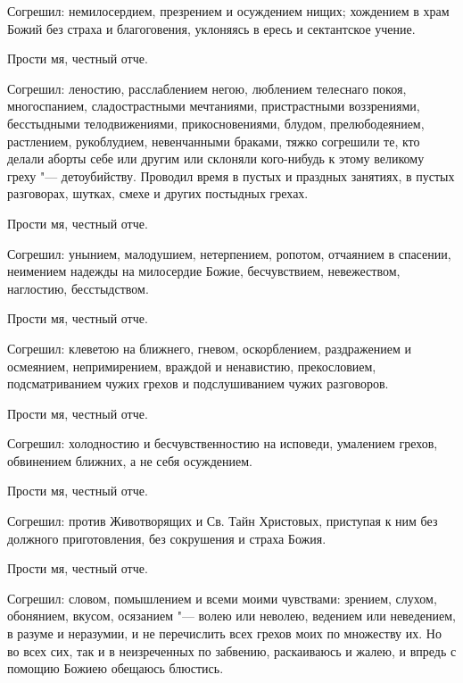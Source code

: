 Согрешил: немилосердием, презрением и осуждением нищих; хождением в храм Божий без страха и благоговения, уклоняясь в ересь и сектантское учение. 



Прости мя, честный отче. 



Согрешил: леностию, расслаблением негою, люблением телеснаго покоя, многоспанием, сладострастными мечтаниями, пристрастными воззрениями, бесстыдными телодвижениями, прикосновениями, блудом, прелюбодеянием, растлением, рукоблудием, невенчанными браками, тяжко согрешили те, кто делали аборты себе или другим или склоняли кого-нибудь к этому великому греху "--- детоубийству. Проводил время в пустых и праздных занятиях, в пустых разговорах, шутках, смехе и других постыдных грехах. 



Прости мя, честный отче. 



Согрешил: унынием, малодушием, нетерпением, ропотом, отчаянием в спасении, неимением надежды на милосердие Божие, бесчувствием, невежеством, наглостию, бесстыдством. 



Прости мя, честный отче. 



Согрешил: клеветою на ближнего, гневом, оскорблением, раздражением и осмеянием, непримирением, враждой и ненавистию, прекословием, подсматриванием чужих грехов и подслушиванием чужих разговоров. 



Прости мя, честный отче. 



Согрешил: холодностию и бесчувственностию на исповеди, умалением грехов, обвинением ближних, а не себя осуждением. 



Прости мя, честный отче. 



Согрешил: против Животворящих и Св. Тайн Христовых, приступая к ним без должного приготовления, без сокрушения и страха Божия. 



Прости мя, честный отче. 



Согрешил: словом, помышлением и всеми моими чувствами: зрением, слухом, обонянием, вкусом, осязанием "--- волею или неволею, ведением или неведением, в разуме и неразумии, и не перечислить всех грехов моих по множеству их. Но во всех сих, так и в неизреченных по забвению, раскаиваюсь и жалею, и впредь с помощию Божиею обещаюсь блюстись. 



